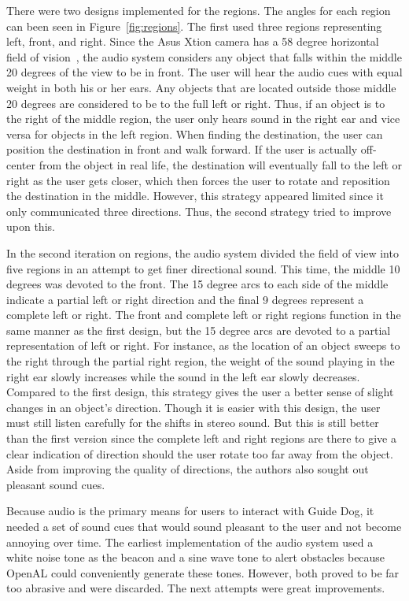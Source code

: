 There were two designs implemented for the regions. The angles for each region 
can been seen in Figure~\ref{fig:regions}. The first used three regions 
representing left, front, and right. Since the Asus Xtion camera has a 58 degree 
horizontal field of vision~\cite{xtion-website}, the audio system considers any 
object that falls within the middle 20 degrees of the view to be in front. The 
user will hear the audio cues with equal weight in both his or her ears. Any 
objects that are located outside those middle 20 degrees are considered to be to 
the full left or right. Thus, if an object is to the right of the middle region, 
the user only hears sound in the right ear and vice versa for objects in the 
left region. When finding the destination, the user can position the destination 
in front and walk forward. If the user is actually off-center from the object in 
real life, the destination will eventually fall to the left or right as the user
gets closer, which then forces the user to rotate and reposition the destination
in the middle. However, this strategy appeared limited since it only
communicated three directions. Thus, the second strategy tried to improve upon
this.

In the second iteration on regions, the audio system divided the field of view
into five regions in an attempt to get finer directional sound. This time, the
middle 10 degrees was devoted to the front. The 15 degree arcs to each side of
the middle indicate a partial left or right direction and the final 9 degrees
represent a complete left or right. The front and complete left or right regions 
function in the same manner as the first design, but the 15 degree arcs are 
devoted to a partial representation of left or right. For instance, as the
location of an object sweeps to the right through the partial right region, the 
weight of the sound playing in the right ear slowly increases while the sound in
the left ear slowly decreases. Compared to the first design, this strategy
gives the user a better sense of slight changes in an object's direction. Though
it is easier with this design, the user must still listen carefully for the
shifts in stereo sound. But this is still better than the first version since the
complete left and right regions are there to give a clear indication of direction
should the user rotate too far away from the object. Aside from improving the
quality of directions, the authors also sought out pleasant sound cues.

Because audio is the primary means for users to interact with Guide Dog, it
needed a set of sound cues that would sound pleasant to the user and not become
annoying over time. The earliest implementation of the audio system used a
white noise tone as the beacon and a sine wave tone to alert obstacles because
OpenAL could conveniently generate these tones. However, both proved to be far
too abrasive and were discarded. The next attempts were great improvements.

